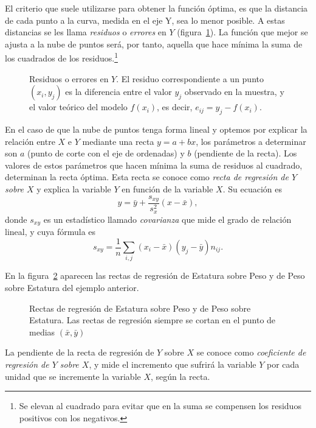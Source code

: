 El criterio que suele utilizarse para obtener la función óptima, es que la distancia
de cada punto a la curva, medida en el eje Y, sea lo menor posible. A estas distancias se les
llama \emph{residuos} o \emph{errores} en $Y$ (figura~\ref{g:residuos}). La función
que mejor se ajusta a la nube de puntos será, por tanto, aquella que hace mínima la
suma de los cuadrados de los residuos.\footnote{Se elevan al cuadrado para evitar que en la suma se compensen los residuos positivos con los negativos.}

\begin{figure}[h!]
  \centering
  \scalebox{0.8}{}
  \caption{Residuos o errores en $Y$. El residuo correspondiente a un punto $(x_i,y_j)$
  es la diferencia entre el valor $y_j$ observado en la muestra, y el valor
  teórico del modelo $f(x_i)$, es decir, $e_{ij}=y_j-f(x_i)$.}\label{g:residuos}
\end{figure}

En el caso de que la nube de puntos tenga forma lineal y optemos por explicar la
relación entre $X$ e $Y$ mediante una recta $y=a+bx$, los parámetros a
determinar son $a$ (punto de corte con el eje de ordenadas) y $b$ (pendiente de
la recta). Los valores de estos parámetros que hacen mínima la suma de
residuos al cuadrado, determinan la recta óptima. Esta recta se conoce como \emph{recta de
regresión de $Y$ sobre $X$} y explica la variable $Y$ en función de la variable
$X$. Su ecuación es
\[ y= \bar{y}+\frac{s_{xy}}{s_x^2}(x-\bar{x}),\]
donde $s_{xy}$ es un estadístico llamado \emph{covarianza} que mide el grado de relación lineal, y cuya fórmula es
\[s_{xy}=\frac{1}{n}\sum_{i,j} (x_i-\bar{x}) (y_j-\bar{y}) n_{ij}.\]

\begin{ejemplo}
En la figura~\ref{g:rectas-estatura-peso} aparecen las rectas de regresión de Estatura sobre Peso y de Peso sobre Estatura del ejemplo anterior.

\begin{figure}[h!]
  \centering
  \scalebox{0.8}{}
  \caption{Rectas de regresión de Estatura sobre Peso y de Peso sobre Estatura. Las rectas de regresión siempre se cortan en el punto de medias $(\bar x, \bar y)$}\label{g:rectas-estatura-peso}
\end{figure}
\end{ejemplo}

La pendiente de la recta de regresión de $Y$ sobre $X$ se conoce como
\emph{coeficiente de regresión de $Y$ sobre $X$}, y mide el incremento que sufrirá
la variable $Y$ por cada unidad que se incremente la variable $X$, según la recta.

